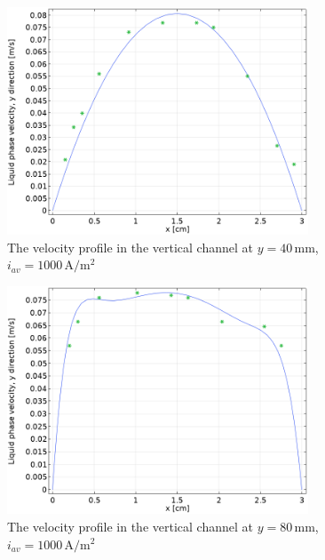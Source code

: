 \begin{figure}[H]
    \centering
    \includegraphics[width = 0.8\textwidth]{validation1.png}
    \caption{The velocity profile in the vertical channel at $y = 40 \, \mathrm{mm}$, $i_{av} = 1000 \, \mathrm{A/m^2}$}
    \label{validation1}
\end{figure}

\begin{figure}[H]
    \centering
    \includegraphics[width = 0.8\textwidth]{validation2.png}
    \caption{The velocity profile in the vertical channel at $y = 80 \, \mathrm{mm}$, $i_{av} = 1000 \, \mathrm{A/m^2}$}
    \label{validation2}
\end{figure}

